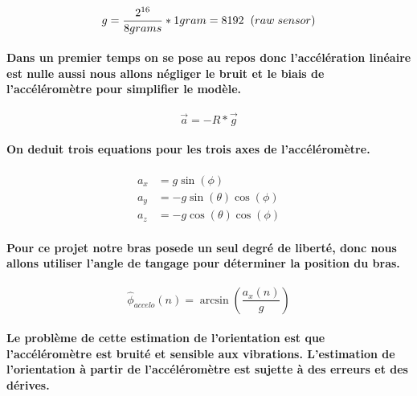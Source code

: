 \begin{equation*}
	g = \frac{2^{16}}{8grams} * 1gram = 8192\hspace*{.2cm}(raw\hspace*{.1cm}sensor)
\end{equation*}



\paragraph{Dans un premier temps on se pose au repos donc l'accélération linéaire est nulle aussi nous allons négliger le bruit et le biais de l'accéléromètre pour simplifier le modèle.}

\begin{equation*}
	\vec{a} = -R * \vec{g}
\end{equation*}

\paragraph{On deduit trois equations pour les trois axes de l'accéléromètre.}

\begin{align*}
	a_x &= g \sin(\phi) \\
	a_y &= -g \sin(\theta) \cos(\phi)\\
	a_z &= -g \cos(\theta) \cos(\phi)
\end{align*}

\paragraph{Pour ce projet notre bras posede un seul degré de liberté, donc nous allons utiliser l'angle de tangage pour déterminer la position du bras.}


\begin{equation}
	\hat{\phi}_{accelo}(n) = \arcsin\left(\frac{a_x(n)}{g}\right)
\end{equation}

\paragraph{Le problème de cette estimation de l'orientation est que l'accéléromètre est bruité et sensible aux vibrations. L'estimation de l'orientation à partir de l'accéléromètre est sujette à des erreurs et des dérives.}

